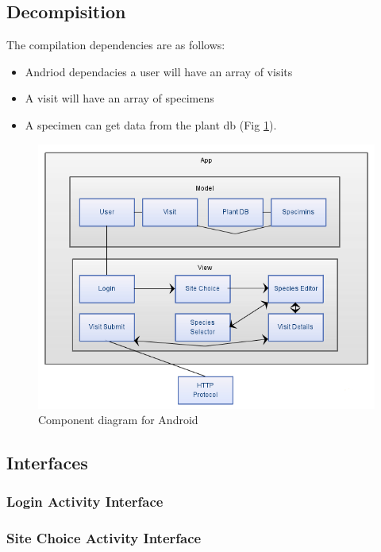 \subsection{Decompisition}
	The compilation dependencies are as follows:
	\begin{itemize}
		\item Andriod dependacies a user will have an array of visits
		\item A visit will have an array of specimens
		\item A specimen can get data from the plant db (Fig \ref{fig:androidComponentDiagram}).
	\end{itemize}
	
	\begin{figure}
		\centering
			\includegraphics[scale=0.75]{android/componentDiagram.png}
		\caption{Component diagram for Android}
		\label{fig:androidComponentDiagram}
	\end{figure}

\newpage
\subsection{Interfaces}
	\subsubsection{Login Activity Interface}
		

	\newpage
	\subsubsection{Site Choice Activity Interface}
		

